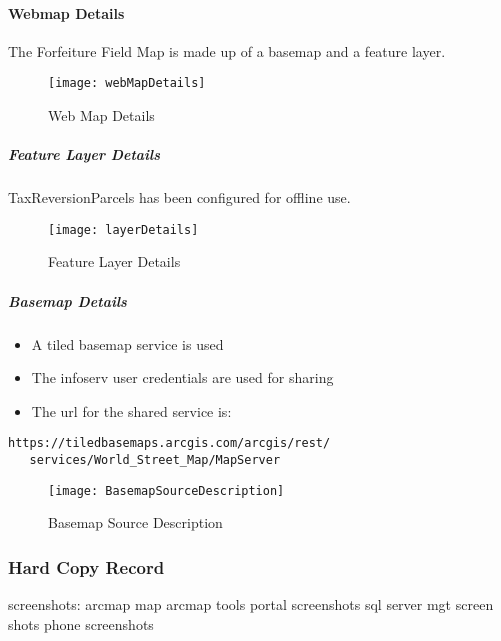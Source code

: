 \paragraph{Webmap Details}The Forfeiture Field Map is made up of a basemap and a feature layer.
\begin{figure}[h!]
\centering
    \texttt{[image: webMapDetails]}
\caption{Web Map Details}
\end{figure}
\subparagraph{Feature Layer Details}TaxReversionParcels has been configured for offline use.
\begin{figure}[h!]
\centering
    \texttt{[image: layerDetails]}
\caption{Feature Layer Details}
\end{figure}
\clearpage
\subparagraph{Basemap Details}
\begin{itemize}
  \setlength\itemsep{4em}
  \item A tiled basemap service is used
  \item The infoserv user credentials are used for sharing
  \item The url for the shared service is:
\end{itemize}
\begin{verbatim}
https://tiledbasemaps.arcgis.com/arcgis/rest/
   services/World_Street_Map/MapServer
\end{verbatim}
\begin{figure}[h!]
\centering
\texttt{[image: BasemapSourceDescription]}
\caption{Basemap Source Description}
\end{figure}
\clearpage
%
%
%
\subsubsection{Hard Copy Record}
screenshots:
arcmap map
arcmap tools
portal screenshots
sql server mgt screen shots
phone screenshots
